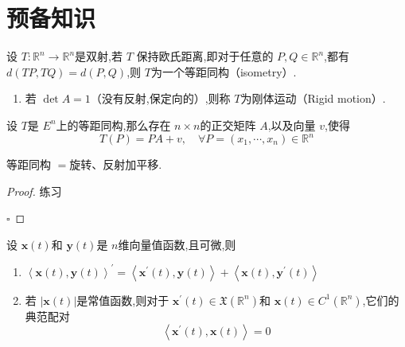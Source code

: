 \documentclass[../../古典微分几何.tex]{subfiles}
\begin{document}
    
\chapter{预备知识}

\begin{definition}
    设 \(  T: \mathbb{R} ^{n}\to \mathbb{R} ^{n}  \)是双射,若 \(  T  \)
    保持欧氏距离,即对于任意的 \(  P,Q \in \mathbb{R} ^{n}  \),都有 
    \(  d\left( TP,TQ \right)= d\left( P,Q \right)    \),则 \(  T  \)为一个等距同构（isometry）.     
\end{definition}

\begin{remark}
    \begin{enumerate}
        \item 若 \(  \det A =  1  \)（没有反射,保定向的）,则称 \(  T  \)为刚体运动（Rigid motion）.  
    \end{enumerate}
    
\end{remark}

\begin{theorem}
    设 \(  T  \)是 \(  E^{n}  \)上的等距同构,那么存在 \(  n\times n  \)的正交矩阵 \(  A  \),以及向量 \(  v  \),使得 \[
        T\left( P \right)=  PA + v,\quad \forall  P = \left(  x_1,\cdots,x_n  \right) \in \mathbb{R} ^{n} 
        \]    
\end{theorem}

\begin{note}

    等距同构 \(  =   \)旋转、反射加平移. 

\end{note}

\begin{proof}
    练习

    \hfill $\square$
\end{proof}

\begin{exercise}
    设 \(  \mathbf{x}\left( t \right)   \)和 \(  \mathbf{y}\left( t \right)   \)是 \(  n  \)维向量值函数,且可微,则
    \begin{enumerate}
        \item  \(  \left<\mathbf{x}\left( t \right),\mathbf{y}\left( t \right)   \right>^{\prime} =  \left<\mathbf{x}^{\prime} \left( t \right),\mathbf{y}\left( t \right)   \right>+  \left<\mathbf{x}\left( t \right),\mathbf{y}^{\prime} \left( t \right)   \right>   \)
        \item 若 \(  \left| \mathbf{x}\left( t \right)  \right|   \)是常值函数,则对于 \(  \mathbf{x}^{\prime} \left( t \right)\in \mathfrak{X}\left( \mathbb{R} ^{n} \right)   \)和 \(  \mathbf{x}\left( t \right) \in C^{1}\left( \mathbb{R} ^{n} \right)   \),它们的典范配对 \[
        \left<\mathbf{x}^{\prime} \left( t \right),\mathbf{x}\left( t \right)   \right>= 0
        \]    
    \end{enumerate}
       
\end{exercise}
\end{document}
